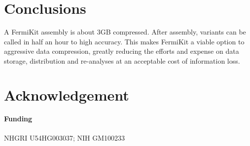 \documentclass{bioinfo}
\begin{document}
\section{Conclusions}

A FermiKit assembly is about 3GB compressed. After assembly, variants can be
called in half an hour to high accuracy. This makes FermiKit a viable option to
aggressive data compression, greatly reducing the efforts and expense on data
storage, distribution and re-analyses at an acceptable cost of information loss.

\section*{Acknowledgement}
\paragraph{Funding\textcolon} NHGRI U54HG003037; NIH GM100233


\end{document}
